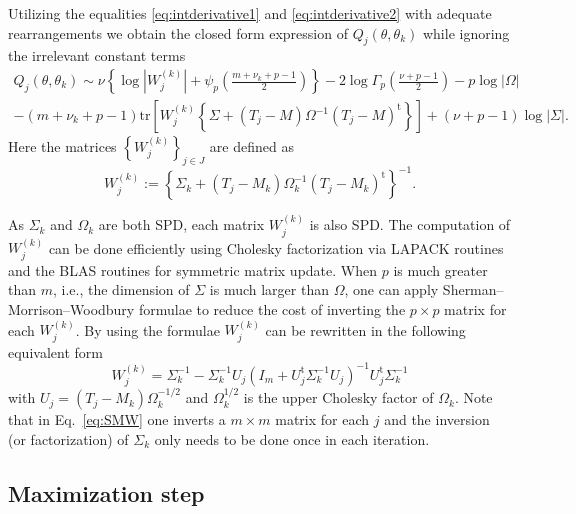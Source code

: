 \documentclass[english,listof=totoc]{scrartcl}
\begin{document}
Utilizing the equalities \eqref{eq:intderivative1} and \eqref{eq:intderivative2} with adequate rearrangements we obtain the closed form expression of $Q_j(\theta,\theta_k)$ while ignoring the irrelevant constant terms
\begin{equation}
\begin{split}Q_j(\theta,\theta_k) \sim \nu\left\{\log|W_j^{(k)}|+\psi_{p}\left(\frac{m+\nu_k+p-1}{2}\right)\right\}-2\log\Gamma_{p}\left(\frac{\nu+p-1}{2}\right)-p\log|\Omega|\\
-(m+\nu_k+p-1)\textrm{tr}\left[W_j^{(k)}\left\{\Sigma+(T_j-M)\Omega^{-1}(T_j-M)^{\textrm{t}}\right\}\right]+(\nu+p-1)\log |\Sigma|.
\end{split}
\label{eq:fsimp}
\end{equation}
Here the matrices $\left\{W_j^{(k)}\right\}_{j\in J}$ are defined as
\begin{equation}
W_j^{(k)}:=\left\{\Sigma_k+(T_j-M_k)\Omega_k^{-1}(T_j-M_k)^{\textrm{t}}\right\}^{-1}.
\end{equation}

As $\Sigma_k$ and $\Omega_k$ are both SPD, each matrix $W_j^{(k)}$ is also SPD. The computation of $W_j^{(k)}$ can be done efficiently using Cholesky factorization via LAPACK routines and the BLAS routines for symmetric matrix update. When $p$ is much greater than $m$, i.e., the dimension of $\Sigma$ is much larger than $\Omega$, one can apply Sherman--Morrison--Woodbury formulae \citep{doi:10.1137/1023004} to reduce the cost of inverting the $p\times p$ matrix for each $W_j^{(k)}$. By using the formulae $W_j^{(k)}$ can be rewritten in the following equivalent form
\begin{equation}
W_j^{(k)}=\Sigma_k^{-1}-\Sigma_k^{-1}U_j\left(I_m+U_j^{\textrm{t}}\Sigma_k^{-1}U_j\right)^{-1}U_j^{\textrm{t}}\Sigma_k^{-1}\label{eq:SMW}
\end{equation}
with $U_j=(T_j-M_k)\Omega_k^{-1/2}$ and $\Omega_k^{1/2}$ is the upper Cholesky factor of $\Omega_k$. Note that in Eq.~\eqref{eq:SMW} one inverts a $m\times m$ matrix for each $j$ and the inversion (or factorization) of $\Sigma_k$ only needs to be done once in each iteration.

\subsection{Maximization step}
\end{document}
